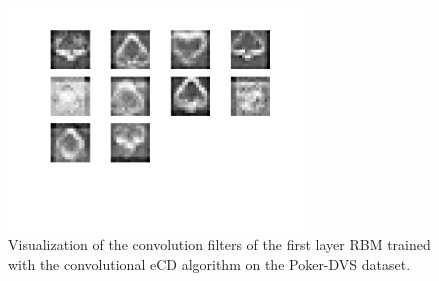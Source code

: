 \begin{figure}[h!]
	\centering
    	\includegraphics[width=0.7\textwidth]{imgs/poker/w2.png} 
    \caption{Visualization of the convolution filters of the first layer RBM trained with the convolutional eCD algorithm on the Poker-DVS dataset.}
	\label{fig:pokerw}
\end{figure}

